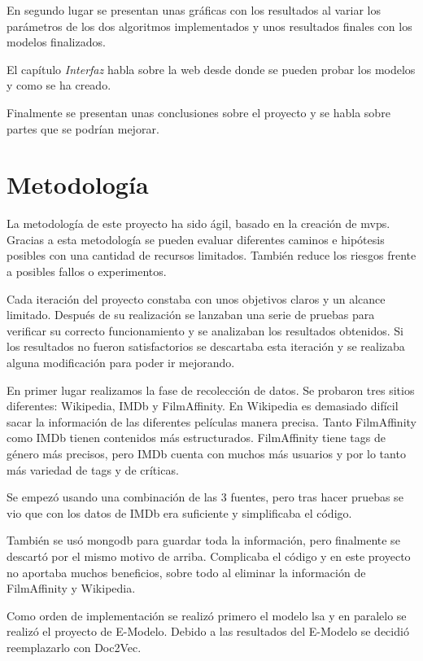 \documentclass[withindex, glossary]{cam-thesis}
\begin{document}
En segundo lugar se presentan unas gráficas con los resultados al variar los parámetros de los dos algoritmos implementados y unos resultados finales con los modelos finalizados.

El capítulo \textit{Interfaz} habla sobre la web desde donde se pueden probar los modelos y como se ha creado.

Finalmente se presentan unas conclusiones sobre el proyecto y se habla sobre partes que se podrían mejorar.

\chapter{Metodología}
La metodología de este proyecto ha sido ágil, basado en la creación de \acrshort{mvp}s. Gracias a esta metodología se pueden evaluar diferentes caminos e hipótesis posibles con una cantidad de recursos limitados. También reduce los riesgos frente a posibles fallos o experimentos.

Cada iteración del proyecto constaba con unos objetivos claros y un alcance limitado. Después de su realización se lanzaban una serie de pruebas para verificar su correcto funcionamiento y se analizaban los resultados obtenidos. Si los resultados no fueron satisfactorios se descartaba esta iteración y se realizaba alguna modificación para poder ir mejorando.

En primer lugar realizamos la fase de recolección de datos. Se probaron tres sitios diferentes: Wikipedia, IMDb\cite{imdb} y FilmAffinity. En Wikipedia es demasiado difícil sacar la información de las diferentes películas manera precisa. Tanto FilmAffinity como IMDb\cite{imdb} tienen contenidos más estructurados. FilmAffinity tiene tags de género más precisos, pero IMDb\cite{imdb} cuenta con muchos más usuarios y por lo tanto más variedad de tags y de críticas.

Se empezó usando una combinación de las 3 fuentes, pero tras hacer pruebas se vio que con los datos de IMDb\cite{imdb} era suficiente y simplificaba el código.

También se usó \Gls{mongodb} para guardar toda la información, pero finalmente se descartó por el mismo motivo de arriba. Complicaba el código y en este proyecto no aportaba muchos beneficios, sobre todo al eliminar la información de FilmAffinity y Wikipedia.

Como orden de implementación se realizó primero el modelo \acrshort{lsa} y en paralelo se realizó el proyecto de E-Modelo\cite{emodelo}. Debido a las resultados del E-Modelo se decidió reemplazarlo con Doc2Vec.
\end{document}
